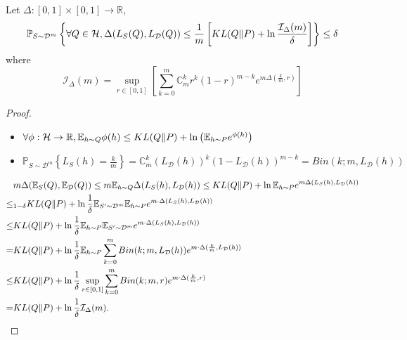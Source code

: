 \begin{theorem}
    Let $ \Delta: [0,1] \times [0,1] \rightarrow \mathbb{R} $,
    \[
        \mathbb{P}_{S \sim \mathcal{D}^m} \left\{ \forall Q \in \mathcal{H}, \Delta(L_S(Q), L_{\mathcal{D}}(Q)) \le \frac{1}{m} \left[ KL(Q \Arrowvert P) + \ln \frac{\mathcal{I}_{\Delta}(m)}{\delta}  \right] \right\} \le \delta
    \]
    where
    \[
        \mathcal{I}_{\Delta}(m) = \sup_{r \in [0,1]} \left[ \sum^{m}_{k=0} \mathbb{C}^k_{m} r^{k} {(1 - r)}^{m-k} e^{m\Delta(\frac{k}{m}, r)} \right]
    \]
    \begin{proof}
        \begin{itemize}
            \item $ \forall \phi: \mathcal{H} \rightarrow \mathbb{R}, \mathbb{E}_{h \sim Q} \phi(h) \le KL(Q \Arrowvert P) + \ln \left( \mathbb{E}_{h \sim P} e^{\phi(h)} \right)$
            \item $ \mathbb{P}_{S \sim \mathcal{D}^m} \left\{ L_S(h) = \frac{k}{m} \right\} = \mathbb{C}^k_m {(L _{\mathcal{D}}(h))}^k {(1 - L_{\mathcal{D}}(h))}^{m-k} = Bin(k; m, L_{\mathcal{D}}(h))$ 
        \end{itemize}
        \begin{align*}
            &m \Delta(\mathbb{E}_S(Q), \mathbb{E}_{\mathcal{D}}(Q)) \le m\mathbb{E}_{h \sim Q}\Delta(L_S(h), L_\mathcal{D}(h)) \le KL(Q \Arrowvert P) + \ln \mathbb{E}_{h \sim P} e^{m \Delta(L_S(h), L_{\mathcal{D}}(h))}\\
            \le&_{1 - \delta} KL(Q \Arrowvert P) + \ln \frac{1}{\delta} \mathbb{E}_{S' \sim \mathcal{D}^m} \mathbb{E}_{h \sim P} e^{m \cdot \Delta(L_S(h), L_{\mathcal{D}}(h))}\\
            \le& KL(Q \Arrowvert P) + \ln \frac{1}{\delta} \mathbb{E}_{h \sim P} \mathbb{E}_{S' \sim \mathcal{D}^m}  e^{m \cdot \Delta(L_S(h), L_{\mathcal{D}}(h))}\\
            =&  KL(Q \Arrowvert P) + \ln \frac{1}{\delta} \mathbb{E}_{h \sim P} \sum^{m}_{k=0} Bin(k;m, L_{\mathcal{D}}(h)) e^{m\cdot \Delta(\frac{k}{m} , L_{\mathcal{D}}(h))}\\
            \le& KL(Q \Arrowvert P) + \ln \frac{1}{\delta} \sup_{r \in [0,1]} \sum^{m}_{k=0} Bin(k;m,r) e^{m\cdot \Delta(\frac{k}{m} , r)}\\
            =& KL(Q \Arrowvert P) + \ln \frac{1}{\delta} \mathcal{I}_{\Delta}(m).
        \end{align*}
    \end{proof}
\end{theorem}

